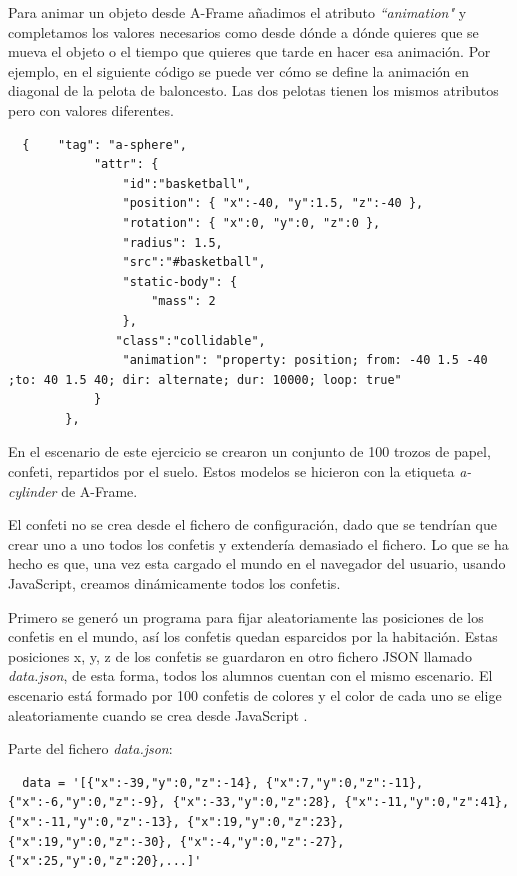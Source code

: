 Para animar un objeto desde A-Frame añadimos el atributo \textit{``animation"} y completamos los valores necesarios como desde dónde a dónde quieres que se mueva  el objeto o el tiempo que quieres que tarde en hacer esa animación. Por ejemplo, en el siguiente código se puede ver cómo se define la animación en diagonal de la pelota de baloncesto. Las dos pelotas tienen los mismos atributos pero con valores diferentes.
\begin{lstlisting}
  {    "tag": "a-sphere",
            "attr": {
                "id":"basketball",
                "position": { "x":-40, "y":1.5, "z":-40 },
                "rotation": { "x":0, "y":0, "z":0 },
                "radius": 1.5,
                "src":"#basketball",
                "static-body": {
                    "mass": 2
                },              
	           "class":"collidable",
                "animation": "property: position; from: -40 1.5 -40 ;to: 40 1.5 40; dir: alternate; dur: 10000; loop: true"
            }
        },
\end{lstlisting}

En el escenario de este ejercicio se crearon un conjunto de 100 trozos de papel, confeti, repartidos por el suelo. Estos modelos se hicieron con la etiqueta \textit{a-cylinder} de A-Frame.  

El confeti no se crea desde el fichero de configuración, dado que se tendrían que crear uno a uno todos los confetis y extendería demasiado el fichero. Lo que se ha hecho es que, una vez esta cargado el mundo en el navegador del usuario, usando JavaScript, creamos dinámicamente todos los confetis.

Primero se generó un programa para fijar aleatoriamente las posiciones de los confetis en el mundo, así los confetis quedan esparcidos por la habitación. Estas posiciones x, y, z de los confetis se guardaron en otro fichero JSON llamado \textit{data.json}, de esta forma, todos los alumnos cuentan con el mismo escenario. El escenario está formado por 100 confetis de colores y el color de cada uno se elige aleatoriamente cuando se crea desde JavaScript .

Parte del fichero \textit{data.json}: 
\begin{lstlisting}
  data = '[{"x":-39,"y":0,"z":-14}, {"x":7,"y":0,"z":-11}, {"x":-6,"y":0,"z":-9}, {"x":-33,"y":0,"z":28}, {"x":-11,"y":0,"z":41}, {"x":-11,"y":0,"z":-13}, {"x":19,"y":0,"z":23}, {"x":19,"y":0,"z":-30}, {"x":-4,"y":0,"z":-27}, {"x":25,"y":0,"z":20},...]'
 \end{lstlisting}


